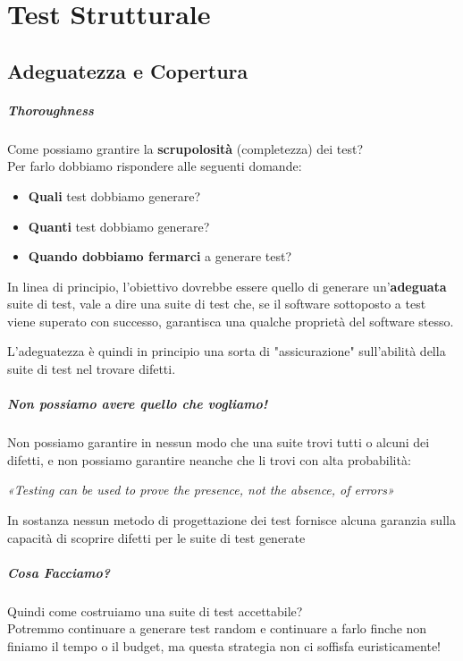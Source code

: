 \chapter{Test Strutturale}
\section{Adeguatezza e Copertura}
\paragraph{Thoroughness}
Come possiamo grantire la \textbf{scrupolosità} (completezza) dei test?
\\Per farlo dobbiamo rispondere alle seguenti domande:
\begin{itemize}
    \item \textbf{Quali} test dobbiamo generare?
    \item \textbf{Quanti} test dobbiamo generare?
    \item \textbf{Quando dobbiamo fermarci} a generare test?
\end{itemize}
In linea di principio, l'obiettivo dovrebbe essere quello di generare un'\textbf{adeguata} suite di test, vale a dire
una suite di test che, se il software sottoposto a test viene superato con successo, garantisca
una qualche proprietà del software stesso.

L'adeguatezza è quindi in principio una sorta di "assicurazione" sull'abilità della suite di test nel trovare difetti.

\paragraph{Non possiamo avere quello che vogliamo!}
Non possiamo garantire in nessun modo che una suite trovi tutti o alcuni dei difetti, e non possiamo garantire neanche che li trovi con alta probabilità:
\begin{center}
    \emph{«Testing can be used to prove the presence, not the absence, of errors»}
\end{center}
In sostanza nessun metodo di progettazione dei test fornisce alcuna garanzia sulla capacità di
scoprire difetti per le suite di test generate

\paragraph{Cosa Facciamo?}
Quindi come costruiamo una suite di test accettabile?
\\Potremmo continuare a generare test random e continuare a farlo finche non finiamo il tempo o il budget,
ma questa strategia non ci soffisfa euristicamente!

